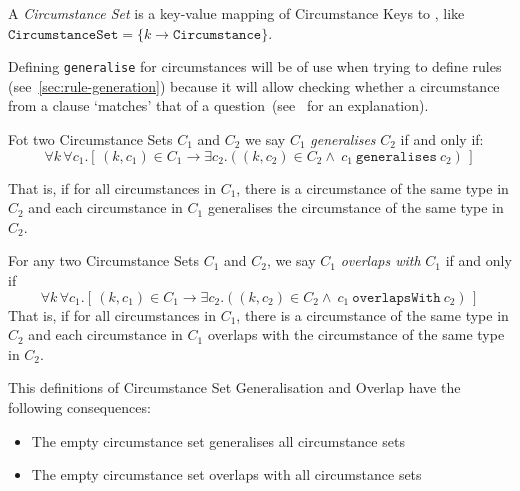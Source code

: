 \begin{definition}
    \label{def:circumstanceSet}
    A \emph{Circumstance Set} is a key-value mapping of Circumstance Keys to , like $\texttt{CircumstanceSet} = \{ k \to \texttt{Circumstance} \}$.
\end{definition}

Defining \texttt{generalise} for circumstances will be of use when trying to define rules (see~\autoref{sec:rule-generation}) because it will allow checking whether a circumstance from a clause `matches' that of a question~(see~ for an explanation).

\begin{definition}
    \label{def:circumstanceSet:generalise}
    Fot two Circumstance Sets $C_1$ and $C_2$ we say $C_1$ \emph{generalises} $C_2$ if and only if:
    \begin{equation}
        \label{eq:circumstanceSet:generalisation}
        \forall k \, \forall c_1.[ \, (k, c_1) \in C_1 \to
        \exists c_2.((k, c_2) \in C_2  \land\ c_1\ \texttt{generalises}\ c_2)\,]
    \end{equation}

    That is, if for all circumstances in $C_1$, there is a circumstance of the same type in $C_2$ and each circumstance in $C_1$ generalises the circumstance of the same type in $C_2$.
\end{definition}

\begin{definition}
    \label{def:circumstanceSet:overlap}
    For any two Circumstance Sets $C_1$ and $C_2$, we say $C_1$ \emph{overlaps with} $C_1$ if and only if
    \begin{equation}
        \label{eq:circumstanceSet:overlap}
        \forall k \, \forall c_1.[ \, (k, c_1) \in C_1 \to
        \exists c_2.((k, c_2) \in C_2  \land\ c_1\ \texttt{overlapsWith}\ c_2)\,]
    \end{equation}
    That is, if for all circumstances in $C_1$, there is a circumstance of the same type in $C_2$ and each circumstance in $C_1$ overlaps with the circumstance of the same type in $C_2$.
\end{definition}

This definitions of Circumstance Set Generalisation and Overlap have the following consequences:
\begin{itemize}
    \item The empty circumstance set generalises all circumstance sets
    \item The empty circumstance set overlaps with all circumstance sets
\end{itemize}


